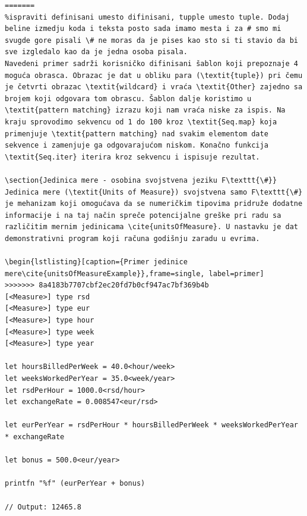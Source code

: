 \documentclass[a4paper]{article}
\begin{document}
\begin{lstlisting}[caption={Primer jedinice mere \cite{unitsOfMeasureExample}},frame=single, label=jedinice]
=======
%ispraviti definisani umesto difinisani, tupple umesto tuple. Dodaj beline izmedju koda i teksta posto sada imamo mesta i za # smo mi svugde gore pisali \# ne moras da je pises kao sto si ti stavio da bi sve izgledalo kao da je jedna osoba pisala.
Navedeni primer sadrži korisničko difinisani šablon koji prepoznaje 4 moguća obrasca. Obrazac je dat u obliku para (\textit{tuple}) pri čemu je četvrti obrazac \textit{wildcard} i vraća \textit{Other} zajedno sa brojem koji odgovara tom obrascu. Šablon dalje koristimo u \textit{pattern matching} izrazu koji nam vraća niske za ispis. Na kraju sprovodimo sekvencu od 1 do 100 kroz \textit{Seq.map} koja primenjuje \textit{pattern matching} nad svakim elementom date sekvence i zamenjuje ga odgovarajućom niskom. Konačno funkcija \textit{Seq.iter} iterira kroz sekvencu i ispisuje rezultat.

\section{Jedinica mere - osobina svojstvena jeziku F\texttt{\#}}
Jedinica mere (\textit{Units of Measure}) svojstvena samo F\texttt{\#} je mehanizam koji omogućava da se numeričkim tipovima pridruže dodatne informacije i na taj način spreče potencijalne greške pri radu sa različitim mernim jedinicama \cite{unitsOfMeasure}. U nastavku je dat demonstrativni program koji računa godišnju zaradu u evrima.

\begin{lstlisting}[caption={Primer jedinice mere\cite{unitsOfMeasureExample}},frame=single, label=primer]
>>>>>>> 8a4183b7707cbf2ec20fd7b0cf947ac7bf369b4b
[<Measure>] type rsd
[<Measure>] type eur
[<Measure>] type hour
[<Measure>] type week
[<Measure>] type year

let hoursBilledPerWeek = 40.0<hour/week>
let weeksWorkedPerYear = 35.0<week/year>
let rsdPerHour = 1000.0<rsd/hour>
let exchangeRate = 0.008547<eur/rsd>

let eurPerYear = rsdPerHour * hoursBilledPerWeek * weeksWorkedPerYear * exchangeRate

let bonus = 500.0<eur/year>

printfn "%f" (eurPerYear + bonus)

// Output: 12465.8

\end{lstlisting}
\end{document}
